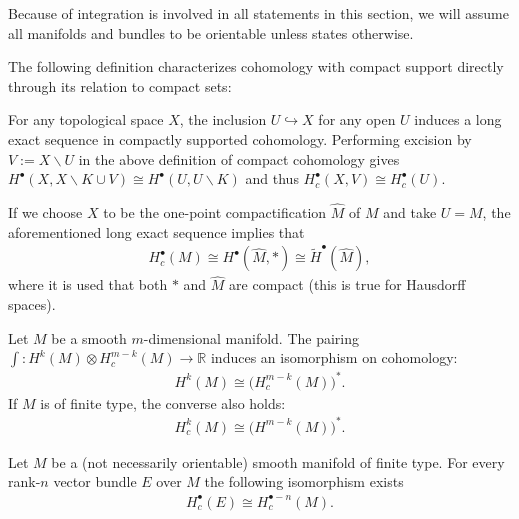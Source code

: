     Because of integration is involved in all statements in this section, we will assume all manifolds and bundles to be orientable unless states otherwise.

    The following definition characterizes cohomology with compact support directly through its relation to compact sets:
    \begin{property}\label{diff:reduced_compact_cohomology}
        For any topological space $X$, the inclusion $U\hookrightarrow X$ for any open $U$ induces a long exact sequence in compactly supported cohomology. Performing excision by $V:=X\backslash U$ in the above definition of compact cohomology gives $H^\bullet(X,X\backslash K\cup V)\cong H^\bullet(U,U\backslash K)$ and thus $H^\bullet_c(X,V)\cong H^\bullet_c(U)$.

        If we choose $X$ to be the one-point compactification $\widehat{M}$ of $M$ and take $U=M$, the aforementioned long exact sequence implies that
        \begin{gather}
            H^\bullet_c(M)\cong H^\bullet(\widehat{M}, \ast)\cong\widetilde{H}^\bullet(\widehat{M}),
        \end{gather}
        where it is used that both $\ast$ and $\widehat{M}$ are compact (this is true for Hausdorff spaces).
    \end{property}

    \begin{theorem}\label{diff:poincare_duality}
        Let $M$ be a smooth $m$-dimensional manifold. The pairing $\int:H^k(M)\otimes H^{m-k}_c(M)\rightarrow\mathbb{R}$ induces an isomorphism on cohomology:
        \begin{gather}
            H^k(M)\cong\Big(H^{m-k}_c(M)\Big)^*.
        \end{gather}
        If $M$ is of finite type, the converse also holds:
        \begin{gather}
            H^k_c(M)\cong\Big(H^{m-k}(M)\Big)^*.
        \end{gather}
    \end{theorem}
    \begin{result}
        Let $M$ be a (not necessarily orientable) smooth manifold of finite type. For every rank-$n$ vector bundle $E$ over $M$ the following isomorphism exists
        \begin{gather}
            H^\bullet_c(E)\cong H^{\bullet-n}_c(M).
        \end{gather}
    \end{result}

